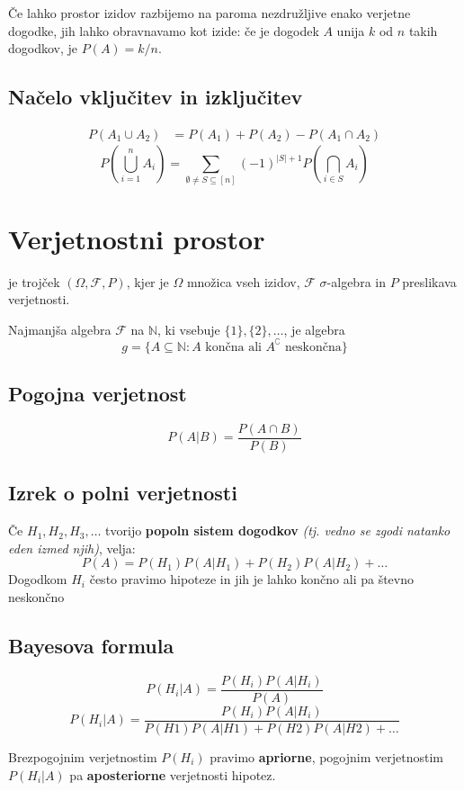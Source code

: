 \begin{multicols}{4}
Če lahko prostor izidov razbijemo na paroma nezdružljive enako verjetne dogodke, jih lahko obravnavamo kot izide: če je dogodek $A$ unija $k$ od $n$ takih dogodkov, je $P(A) = k/n$.

\subsection{Načelo vključitev in izključitev}
\begin{align*}
	P(A_1 \cup A_2) &= P(A_1) + P(A_2) - P(A_1 \cap A_2)
\end{align*}
\[ P( \bigcup_{i=1}^n A_i) = \sum_{\emptyset \neq S \subseteq [n]} (-1)^{|S|+1} P(\bigcap_{i\in S} A_i)\]

\section{Verjetnostni prostor}
je trojček $(\Omega, \mathcal{F}, P)$, kjer je $\Omega$ množica vseh izidov, $\mathcal{F}$ $\sigma$-algebra in $P$ preslikava verjetnosti.


Najmanjša algebra $\mathcal{F}$ na $\mathbb{N}$, ki vsebuje $ \{1\}, \{2\}, \dots$, je algebra \[g = \{ A \subseteq \mathbb{N} : \text{$A$ končna ali $A^\complement$ neskončna} \} \]

\subsection{Pogojna verjetnost}
\[ P(A | B) = \frac{P(A \cap B)}{P(B)}\]


\subsection{Izrek o polni verjetnosti}
Če $H_1, H_2, H_3, \dots $ tvorijo \textbf{popoln sistem dogodkov} \textit{(tj. vedno se zgodi natanko eden izmed njih)}, velja:
\[ P(A) = P(H_1) P(A | H_1) + P(H_2) P(A | H_2) + \dots \]
Dogodkom $H_i$ često pravimo hipoteze in jih je lahko končno ali pa števno
neskončno

\subsection{Bayesova formula}
\[ P(H_i | A) = \frac{P(H_i)P(A | H_i)}{P(A)}\]
\[ P(H_i | A) = \frac{P(H_i) P(A | H_i)}{P(H1) P(A | H1) + P(H2) P(A | H2) + \dots } \]

Brezpogojnim verjetnostim $P(H_i)$ pravimo \textbf{apriorne}, pogojnim verjetnostim
$P(H_i | A)$ pa \textbf{aposteriorne} verjetnosti hipotez.


\end{multicols}
